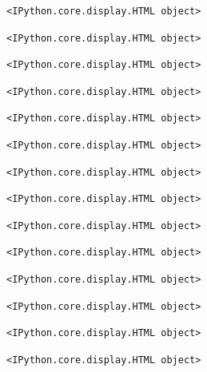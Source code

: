 \documentclass[
  11pt,
  a4paper,
]{scrbook}
\begin{document}
\begin{verbatim}
<IPython.core.display.HTML object>
\end{verbatim}

\begin{verbatim}
<IPython.core.display.HTML object>
\end{verbatim}

\begin{verbatim}
<IPython.core.display.HTML object>
\end{verbatim}

\begin{verbatim}
<IPython.core.display.HTML object>
\end{verbatim}

\begin{verbatim}
<IPython.core.display.HTML object>
\end{verbatim}

\begin{verbatim}
<IPython.core.display.HTML object>
\end{verbatim}

\begin{verbatim}
<IPython.core.display.HTML object>
\end{verbatim}

\begin{verbatim}
<IPython.core.display.HTML object>
\end{verbatim}

\begin{verbatim}
<IPython.core.display.HTML object>
\end{verbatim}

\begin{verbatim}
<IPython.core.display.HTML object>
\end{verbatim}

\begin{verbatim}
<IPython.core.display.HTML object>
\end{verbatim}

\begin{verbatim}
<IPython.core.display.HTML object>
\end{verbatim}

\begin{verbatim}
<IPython.core.display.HTML object>
\end{verbatim}

\begin{verbatim}
<IPython.core.display.HTML object>
\end{verbatim}
\end{document}
